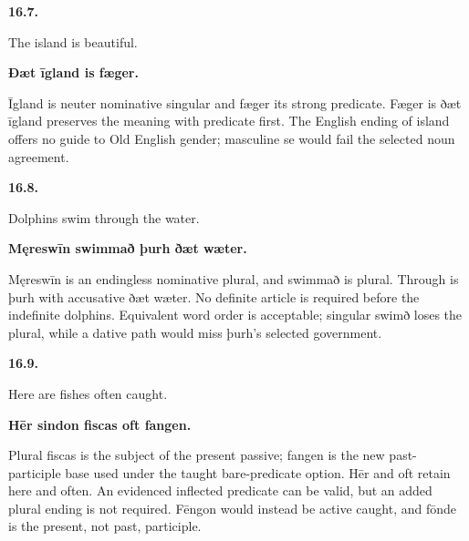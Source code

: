 \par\begin{minipage}{\linewidth}\raggedright
\textbf{16.7.}

The island is beautiful.

\textbf{Ðæt īgland is fæger.}

Īgland is neuter nominative singular and fæger its strong predicate. Fæger is ðæt īgland preserves the meaning with predicate first. The English ending of island offers no guide to Old English gender; masculine se would fail the selected noun agreement.

\end{minipage}\par\addvspace{4pt}

\par\begin{minipage}{\linewidth}\raggedright
\textbf{16.8.}

Dolphins swim through the water.

\textbf{Męreswīn swimmað þurh ðæt wæter.}

Męreswīn is an endingless nominative plural, and swimmað is plural. Through is þurh with accusative ðæt wæter. No definite article is required before the indefinite dolphins. Equivalent word order is acceptable; singular swimð loses the plural, while a dative path would miss þurh's selected government.

\end{minipage}\par\addvspace{4pt}

\par\begin{minipage}{\linewidth}\raggedright
\textbf{16.9.}

Here are fishes often caught.

\textbf{Hēr sindon fiscas oft fangen.}

Plural fiscas is the subject of the present passive; fangen is the new past-participle base used under the taught bare-predicate option. Hēr and oft retain here and often. An evidenced inflected predicate can be valid, but an added plural ending is not required. Fēngon would instead be active caught, and fōnde is the present, not past, participle.

\end{minipage}\par\addvspace{4pt}

